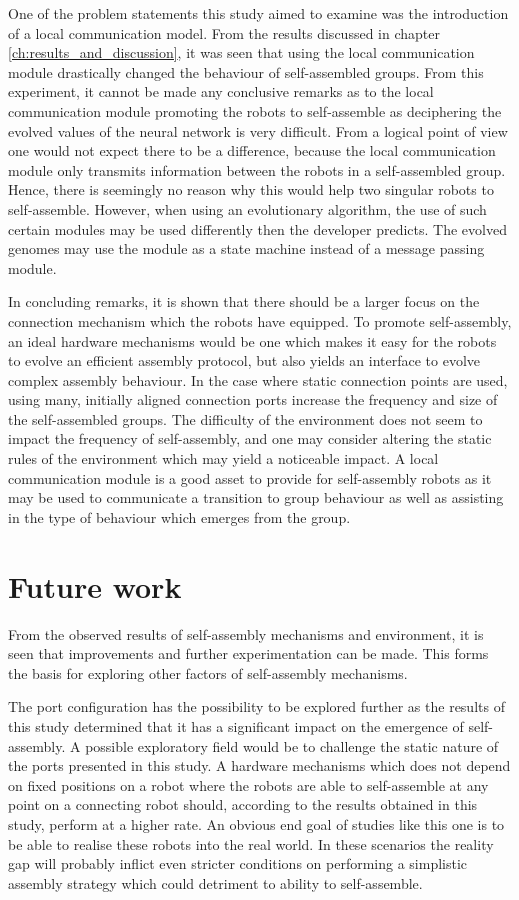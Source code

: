 One of the problem statements this study aimed to examine was the introduction of a local communication model. From the results discussed in chapter  \ref{ch:results_and_discussion}, it was seen that using the local communication module drastically changed the behaviour of self-assembled groups. 
From this experiment, it cannot be made any conclusive remarks as to the local communication module promoting the robots to self-assemble as deciphering the evolved values of the neural network is very difficult.
From a logical point of view one would not expect there to be a difference, because the local communication module only transmits information between the robots in a self-assembled group. 
Hence, there is seemingly no reason why this would help two singular robots to self-assemble.
However, when using an evolutionary algorithm, the use of such certain modules may be used differently then the developer predicts.
The evolved genomes may use the module as a state machine instead of a message passing module.

In concluding remarks, it is shown that there should be a larger focus on the connection mechanism which the robots have equipped.
To promote self-assembly, an ideal hardware mechanisms would be one which makes it easy for the robots to evolve an efficient assembly protocol, but also yields an interface to evolve complex assembly behaviour.
In the case where static connection points are used, using many, initially aligned connection ports increase the frequency and size of the self-assembled groups.
The difficulty of the environment does not seem to impact the frequency of self-assembly, and one may consider altering the static rules of the environment which may yield a noticeable impact.
A local communication module is a good asset to provide for self-assembly robots as it may be used to communicate a transition to group behaviour as well as assisting in the type of behaviour which emerges from the group. 
  


\section{Future work}
From the observed results of self-assembly mechanisms and environment, it is seen that improvements and further experimentation can be made. This forms the basis for exploring other factors of self-assembly mechanisms.

The port configuration has the possibility to be explored further as the results of this study determined that it has a significant impact on the emergence of self-assembly. 
A possible exploratory field would be to challenge the static nature of the ports presented in this study.
A hardware mechanisms which does not depend on fixed positions on a robot where the robots are able to self-assemble at any point on a connecting robot should, according to the results obtained in this study, perform at a higher rate.
An obvious end goal of studies like this one is to be able to realise these robots into the real world.
In these scenarios the reality gap will probably inflict even stricter conditions on performing a simplistic assembly strategy which could detriment to ability to self-assemble.

